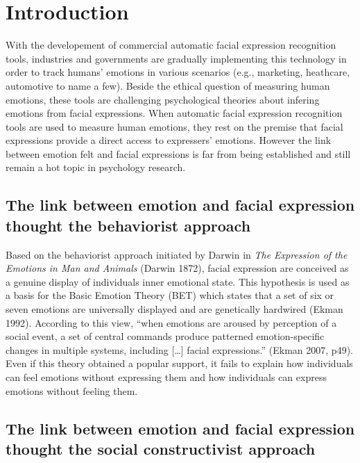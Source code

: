 \documentclass[conference,final,]{IEEEtran}
\begin{document}
\hypertarget{introduction}{%
\section{Introduction}\label{introduction}}

With the developement of commercial automatic facial expression
recognition tools, industries and governments are gradually implementing
this technology in order to track humans' emotions in various scenarios
(e.g., marketing, heathcare, automotive to name a few). Beside the
ethical question of measuring human emotions, these tools are
challenging psychological theories about infering emotions from facial
expressions. When automatic facial expression recognition tools are used
to measure human emotions, they rest on the premise that facial
expressions provide a direct access to expressers' emotions. However the
link between emotion felt and facial expressions is far from being
established and still remain a hot topic in psychology research.

\hypertarget{the-link-between-emotion-and-facial-expression-thought-the-behaviorist-approach}{%
\subsection{The link between emotion and facial expression thought the
behaviorist
approach}\label{the-link-between-emotion-and-facial-expression-thought-the-behaviorist-approach}}

Based on the behaviorist approach initiated by Darwin in \emph{The
Expression of the Emotions in Man and Animals} (Darwin 1872), facial
expression are conceived as a genuine display of individuals inner
emotional state. This hypothesis is used as a basis for the Basic
Emotion Theory (BET) which states that a set of six or seven emotions
are universally displayed and are genetically hardwired (Ekman 1992).
According to this view, ``when emotions are aroused by perception of a
social event, a set of central commands produce patterned
emotion-specific changes in multiple systems, including {[}\ldots{}{]}
facial expressions.'' (Ekman 2007, p49). Even if this theory obtained a
popular support, it fails to explain how individuals can feel emotions
without expressing them and how individuals can express emotions without
feeling them.

\hypertarget{the-link-between-emotion-and-facial-expression-thought-the-social-constructivist-approach}{%
\subsection{The link between emotion and facial expression thought the
social constructivist
approach}\label{the-link-between-emotion-and-facial-expression-thought-the-social-constructivist-approach}}
\end{document}
